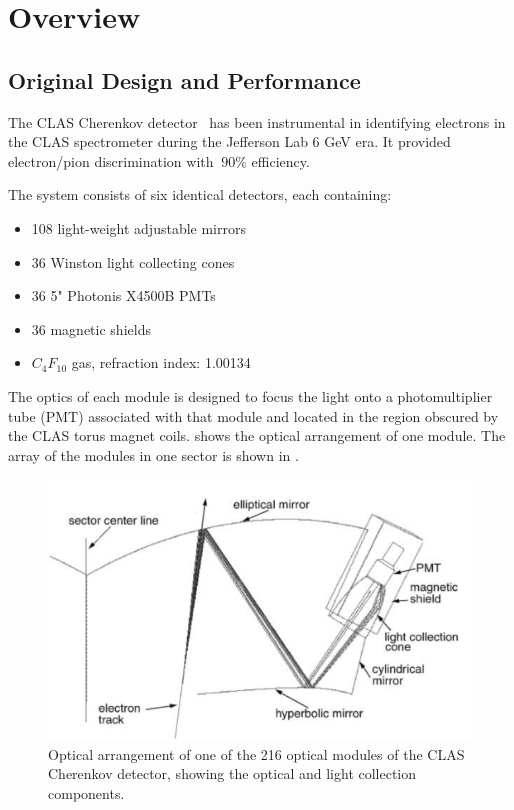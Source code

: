 \section{Overview}



\subsection{Original Design and Performance}

The CLAS Cherenkov detector~\cite{Adams:2001kk} has been instrumental in identifying electrons in the CLAS spectrometer during the Jefferson Lab 6 GeV era.
It provided electron/pion discrimination with $~90\%$ efficiency.

The system consists of six identical detectors, each containing:

\begin{itemize}
	\item 108 light-weight adjustable mirrors
	\item 36 Winston light collecting cones
	\item 36 5" Photonis X4500B PMTs
	\item 36 magnetic shields
\item $C_4F_{10}$ gas, refraction index: 1.00134
\end{itemize}


The optics of each module is designed to focus the light onto a photomultiplier tube (PMT) associated with that module and located in the region
obscured by the CLAS torus magnet coils.
 shows the optical arrangement of one module. The array of the modules in one sector is shown in .

\begin{figure}
	\centering
	\includegraphics[width=1.0\columnwidth,keepaspectratio]{img/optics.png}
	\caption{Optical arrangement of one of the 216 optical modules of the CLAS Cherenkov detector, showing the optical and light collection components.}
	\label{fig:optics}
\end{figure}

